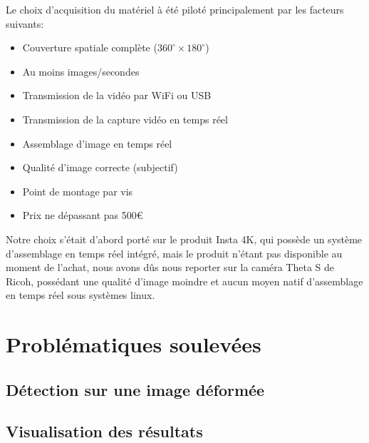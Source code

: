 			Le choix d'acquisition du matériel à été piloté principalement par les facteurs suivants:
			\begin{itemize}[noitemsep]
				\item Couverture spatiale complète ($360^{\circ}\times180^{\circ}$)
				\item Au moins  images/secondes
				\item Transmission de la vidéo par WiFi ou USB
				\item Transmission de la capture vidéo en temps réel
				\item Assemblage d'image en temps réel
				\item Qualité d'image correcte (subjectif)
				\item Point de montage par vis
				\item Prix ne dépassant pas 500\euro
			\end{itemize}
			
			Notre choix s'était d'abord porté sur le produit Insta 4K\cite{insta360}, qui possède un système d'assemblage en temps réel intégré, mais le produit n'étant pas disponible au moment de l'achat, nous avons dûs nous reporter sur la caméra Theta S de Ricoh\cite{ricohthetas}, possédant une qualité d'image moindre et aucun moyen natif d'assemblage en temps réel sous systèmes linux.

	\section{Problématiques soulevées}

		\subsection{Détection sur une image déformée}


		\subsection{Visualisation des résultats}

		
			
